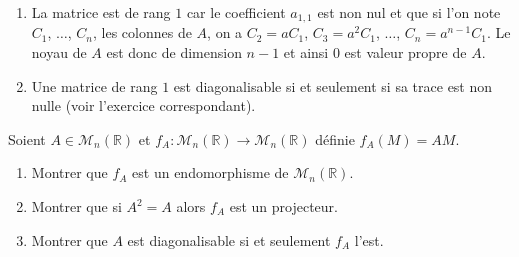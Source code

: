 \documentclass[a4paper,10pt]{report}
\begin{document}
\corr 
\begin{enumerate}
\item La matrice est de rang $1$ car le coefficient $a_{1,1}$ est non nul et que si l'on note $C_1$, $\ldots$, $C_n$, les colonnes de $A$, on a $C_2= aC_1$, $C_3=a^2 C_1$, $\ldots$, $C_n=a^{n-1} C_1$. Le noyau de $A$ est donc de dimension $n-1$ et ainsi $0$ est valeur propre de $A$.
\item Une matrice de rang $1$ est diagonalisable si et seulement si sa trace est non nulle (voir l'exercice correspondant).
\end{enumerate}

\begin{Exercice}{} Soient $A \in \mathcal{M}_n(\mathbb{R})$ et $f_A : \mathcal{M}_n(\mathbb{R}) \rightarrow \mathcal{M}_n(\mathbb{R})$ définie $f_A(M)=AM$.

\begin{enumerate}
\item Montrer que $f_A$ est un endomorphisme de $\mathcal{M}_n(\mathbb{R})$.
\item Montrer que si $A^2=A$ alors $f_A$ est un projecteur.
\item Montrer que $A$ est diagonalisable si et seulement $f_A$ l'est.
\end{enumerate}
\end{Exercice}

\corr 
\end{document}
